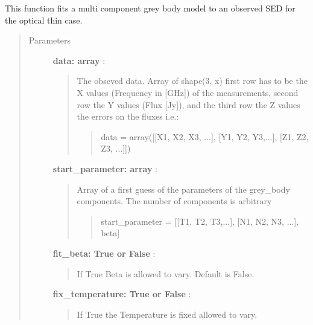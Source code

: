 \documentclass[a4paper,10pt,english]{sphinxmanual}
\begin{document}

\begin{fulllineitems}
\label{functions:astrolyze.functions.astro_functions.grey_body_fit}
This function fits a multi component grey body model to an observed SED for
the optical thin case.
\begin{quote}\begin{description}
\item[{Parameters }] \leavevmode
\textbf{data: array} :
\begin{quote}

The obseved data. Array of shape(3, x) first row has to be the X values
(Frequency in {[}GHz{]}) of the measurements, second row the Y values
(Flux {[}Jy{]}), and the third row  the Z values the errors on the
fluxes i.e.:
\begin{quote}

data = array({[}{[}X1, X2, X3, ...{]}, {[}Y1, Y2, Y3,...{]}, {[}Z1, Z2,
Z3, ...{]}{]})
\end{quote}
\end{quote}

\textbf{start\_parameter: array} :
\begin{quote}

Array of a first guess of the parameters of the grey\_body components.
The number of components is arbitrary
\begin{quote}

start\_parameter = {[}{[}T1, T2, T3,...{]}, {[}N1, N2, N3, ...{]}, beta{]}
\end{quote}
\end{quote}

\textbf{fit\_beta: True or False} :
\begin{quote}

If True Beta is allowed to vary. Default is False.
\end{quote}

\textbf{fix\_temperature: True or False} :
\begin{quote}

If True the Temperature is fixed allowed to vary.
\end{quote}


\end{description}
\end{quote}
\end{fulllineitems}
\end{document}
